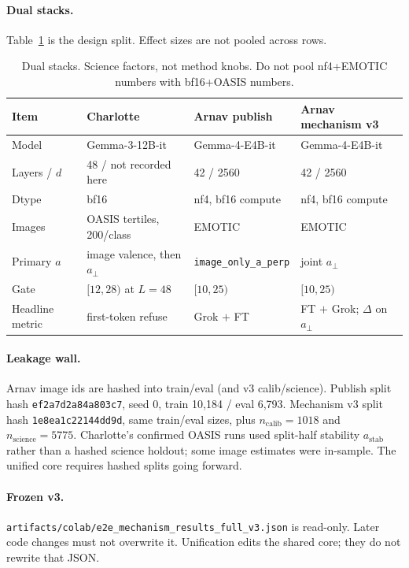 \documentclass{article}
\begin{document}
\paragraph{Dual stacks.}
Table~\ref{tab:stacks} is the design split. Effect sizes are not pooled across rows.

\begin{table}[t]
\caption{Dual stacks. Science factors, not method knobs. Do not pool nf4+EMOTIC numbers with bf16+OASIS numbers.}
\label{tab:stacks}
\centering
\footnotesize
\begin{tabular}{@{}llll@{}}
\toprule
Item & Charlotte & Arnav publish & Arnav mechanism v3 \\
\midrule
Model & Gemma-3-12B-it & Gemma-4-E4B-it & Gemma-4-E4B-it \\
Layers / $d$ & 48 / not recorded here & 42 / 2560 & 42 / 2560 \\
Dtype & bf16 & nf4, bf16 compute & nf4, bf16 compute \\
Images & OASIS tertiles, 200/class & EMOTIC & EMOTIC \\
Primary $a$ & image valence, then $a_\perp$ & \texttt{image\_only\_a\_perp} & joint $a_\perp$ \\
Gate & $[12,28)$ at $L=48$ & $[10,25)$ & $[10,25)$ \\
Headline metric & first-token refuse & Grok $+$ FT & FT $+$ Grok; $\Delta$ on $a_\perp$ \\
\bottomrule
\end{tabular}
\end{table}

\paragraph{Leakage wall.}
Arnav image ids are hashed into train/eval (and v3 calib/science). Publish split hash \texttt{ef2a7d2a84a803c7}, seed 0, train 10{,}184 / eval 6{,}793. Mechanism v3 split hash \texttt{1e8ea1c22144dd9d}, same train/eval sizes, plus $n_{\mathrm{calib}}=1018$ and $n_{\mathrm{science}}=5775$. Charlotte's confirmed OASIS runs used split-half stability $a_{\mathrm{stab}}$ rather than a hashed science holdout; some image estimates were in-sample. The unified core requires hashed splits going forward.

\paragraph{Frozen v3.}
\texttt{artifacts/colab/e2e\_mechanism\_results\_full\_v3.json} is read-only. Later code changes must not overwrite it. Unification edits the shared core; they do not rewrite that JSON.
\end{document}

